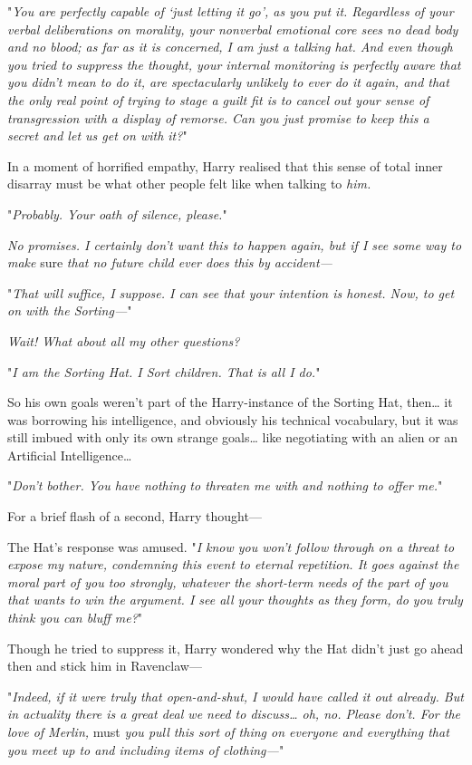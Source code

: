 "\emph{You are perfectly capable of `just letting it go', as you put it.
Regardless of your verbal deliberations on morality, your nonverbal emotional
core sees no dead body and no blood; as far as it is concerned, I am just a
talking hat. And even though you tried to suppress the thought, your internal
monitoring is perfectly aware that you didn't mean to do it, are spectacularly
unlikely to ever do it again, and that the only real point of trying to stage a
guilt fit is to cancel out your sense of transgression with a display of
remorse. Can you just promise to keep this a secret and let us get on with it?}"

In a moment of horrified empathy, Harry realised that this sense of total inner
disarray must be what other people felt like when talking to \emph{him.}

"\emph{Probably. Your oath of silence, please.}"

\emph{No promises. I certainly don't want this to happen again, but if I see
some way to make} sure \emph{that no future child ever does this by accident---}

"\emph{That will suffice, I suppose. I can see that your intention is honest.
Now, to get on with the Sorting---}"

\emph{Wait! What about all my other questions?}

"\emph{I am the Sorting Hat. I Sort children. That is all I do.}"

So his own goals weren't part of the Harry-instance of the Sorting Hat,
then{\ldots} it was borrowing his intelligence, and obviously his technical
vocabulary, but it was still imbued with only its own strange goals{\ldots}
like negotiating with an alien or an Artificial Intelligence{\ldots}

"\emph{Don't bother. You have nothing to threaten me with and nothing to offer
me.}"

For a brief flash of a second, Harry thought---

The Hat's response was amused. "\emph{I know you won't follow through on a
threat to expose my nature, condemning this event to eternal repetition. It
goes against the moral part of you too strongly, whatever the short-term needs
of the part of you that wants to win the argument. I see all your thoughts as
they form, do you truly think you can bluff me?}"

Though he tried to suppress it, Harry wondered why the Hat didn't just go ahead
then and stick him in Ravenclaw---

"\emph{Indeed, if it were truly that open-and-shut, I would have called it out
already. But in actuality there is a great deal we need to discuss{\ldots} oh,
no. Please don't. For the love of Merlin,} must \emph{you pull this sort of
thing on everyone and everything that you meet up to and including items of
clothing---}"


